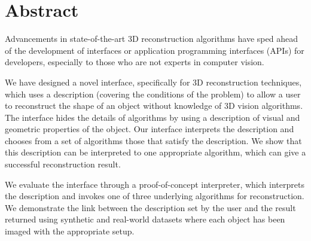 
\chapter{Abstract}

Advancements in state-of-the-art 3D reconstruction algorithms have sped ahead of the development of interfaces or application programming interfaces (APIs) for developers, especially to those who are not experts in computer vision.

We have designed a novel interface, specifically for 3D reconstruction techniques, which uses a description (covering the conditions of the problem) to allow a user to reconstruct the shape of an object without knowledge of 3D vision algorithms. The interface hides the details of algorithms by using a description of visual and geometric properties of the object. Our interface interprets the description and chooses from a set of algorithms those that satisfy the description. We show that this description can be interpreted to one appropriate algorithm, which can give a successful reconstruction result.

We evaluate the interface through a proof-of-concept interpreter, which interprets the description and invokes one of three underlying algorithms for reconstruction. We demonstrate the link between the description set by the user and the result returned using synthetic and real-world datasets where each object has been imaged with the appropriate setup.
